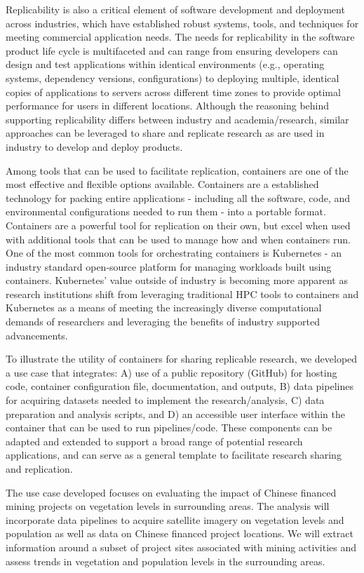 \documentclass[a4paper]{article}
\begin{document}
Replicability is also a critical element of software development and deployment across industries, which have established robust systems, tools, and techniques for meeting commercial application needs. The needs for replicability in the software product life cycle is multifaceted and can range from ensuring developers can design and test applications within identical environments (e.g., operating systems, dependency versions, configurations) to deploying multiple, identical copies of applications to servers across different time zones to provide optimal performance for users in different locations. Although the reasoning behind supporting replicability differs between industry and academia/research, similar approaches can be leveraged to share and replicate research as are used in industry to develop and deploy products.

Among tools that can be used to facilitate replication, containers are one of the most effective and flexible options available. Containers are a established technology for packing entire applications - including all the software, code, and environmental configurations needed to run them - into a portable format\citep{containers}. Containers are a powerful tool for replication on their own, but excel when used with additional tools that can be used to manage how and when containers run. One of the most common tools for orchestrating containers is Kubernetes - an industry standard open-source platform for managing workloads built using containers\citep{k8s}. Kubernetes' value outside of industry is becoming more apparent as research institutions shift from leveraging traditional HPC tools to containers and Kubernetes as a means of meeting the increasingly diverse computational demands of researchers and leveraging the benefits of industry supported advancements.

To illustrate the utility of containers for sharing replicable research, we developed a use case that integrates: A) use of a public repository (GitHub) for hosting code, container configuration file, documentation, and outputs, B) data pipelines for acquiring datasets needed to implement the research/analysis, C) data preparation and analysis scripts, and D) an accessible user interface within the container that can be used to run pipelines/code. These components can be adapted and extended to support a broad range of potential research applications, and can serve as a general template to facilitate research sharing and replication.

The use case developed focuses on evaluating the impact of Chinese financed mining projects on vegetation levels in surrounding areas. The analysis will incorporate data pipelines to acquire satellite imagery on vegetation levels and population as well as data on Chinese financed project locations. We will extract information around a subset of project sites associated with mining activities and assess trends in vegetation and population levels in the surrounding areas. 
\end{document}
